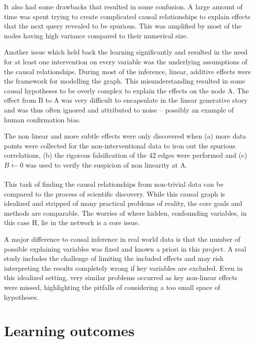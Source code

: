 \documentclass[12pt,fleqn,]{article}
\begin{document}
\begin{multicols}{2}
It also had some drawbacks that resulted in some confusion. A large amount of time was spent trying to create complicated causal relationships to explain effects that the next query revealed to be spurious. This was amplified by most of the nodes having high variance compared to their numerical size.

Another issue which held back the learning significantly and resulted in the need for at least one intervention on every variable was the underlying assumptions of the causal relationships. During most of the inference, linear, additive effects were the framework for modelling the graph. This misunderstanding resulted in some causal hypotheses to be overly complex to explain the effects on the node A. The effect from B to A was very difficult to encapsulate in the linear generative story and was thus often ignored and attributed to noise -- possibly an example of human confirmation bias. 

The non linear and more subtle effects were only discovered when (a) more data points were collected for the non-interventional data to iron out the spurious correlations, (b) the rigorous falsification of the 42 edges were performed and (c) \(\mathring{B\leftarrow0}\) was used to verify the suspicion of non linearity at A.
\\
\\
This task of finding the causal relationships from non-trivial data can be compared to the process of scientific discovery. While this causal graph is idealized and stripped of many practical problems of reality, the core goals and methods are comparable. The worries of where hidden, confounding variables, in this case H, lie in the network is a core issue.

A major difference to causal inference in real world data is that the number of possible explaining variables was fixed and known a priori in this project. A real study includes the challenge of limiting the included effects and may risk interpreting the results completely wrong if key variables are excluded. Even in this idealized setting, very similar problems occurred as key non-linear effects were missed, highlighting the pitfalls of considering a too small space of hypotheses. %

\section{Learning outcomes} 
	
\end{multicols}
\end{document}

